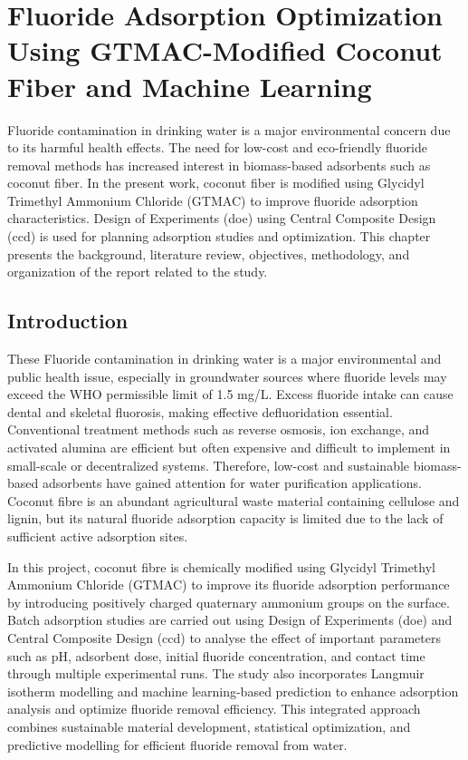 \chapter{Fluoride Adsorption Optimization Using GTMAC-Modified Coconut Fiber and Machine Learning}
 Fluoride contamination in drinking water is a major environmental concern due to its harmful health effects. The need for low-cost and eco-friendly fluoride removal methods has increased interest in biomass-based adsorbents such as coconut fiber. In the present work, coconut fiber is modified using Glycidyl Trimethyl Ammonium Chloride (GTMAC) to improve fluoride adsorption characteristics. Design of Experiments (\gls{doe}) using Central Composite Design (\gls{ccd}) is used for planning adsorption studies and optimization. This chapter presents the background, literature review, objectives, methodology, and organization of the report related to the study. 

\section[Introduction]{\textbf{Introduction}}
These Fluoride contamination in drinking water is a major environmental and public health issue, especially in groundwater sources where fluoride levels may exceed the WHO permissible limit of 1.5 mg/L. Excess fluoride intake can cause dental and skeletal fluorosis, making effective defluoridation essential. Conventional treatment methods such as reverse osmosis, ion exchange, and activated alumina are efficient but often expensive and difficult to implement in small-scale or decentralized systems. Therefore, low-cost and sustainable biomass-based adsorbents have gained attention for water purification applications. Coconut fibre is an abundant agricultural waste material containing cellulose and lignin, but its natural fluoride adsorption capacity is limited due to the lack of sufficient active adsorption sites. 

In this project, coconut fibre is chemically modified using Glycidyl Trimethyl Ammonium Chloride (GTMAC) to improve its fluoride adsorption performance by introducing positively charged quaternary ammonium groups on the surface. Batch adsorption studies are carried out using Design of Experiments (\gls{doe}) and Central Composite Design (\gls{ccd}) to analyse the effect of important parameters such as pH, adsorbent dose, initial fluoride concentration, and contact time through multiple experimental runs. The study also incorporates Langmuir isotherm modelling and machine learning-based prediction to enhance adsorption analysis and optimize fluoride removal efficiency. This integrated approach combines sustainable material development, statistical optimization, and predictive modelling for efficient fluoride removal from water. 

